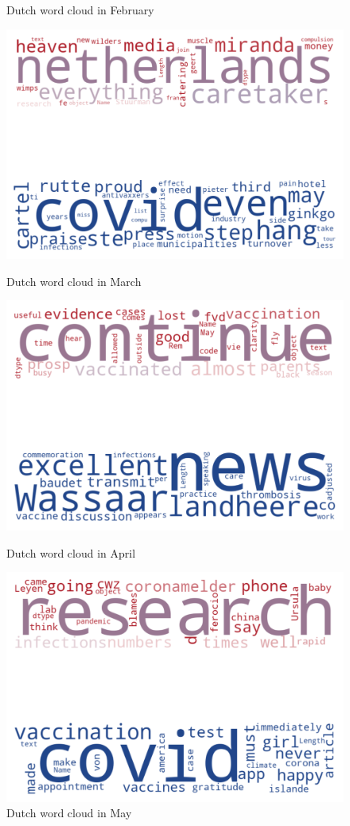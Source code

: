 \begin{landscape}
\begin{figure}[!htb]
  \caption{Dutch word cloud in February}\label{fig:februarynl}
\endminipage
\end{figure}
\begin{figure}[!htb]
  \includegraphics[width=\linewidth]{March nl word cloud.png}
  \caption{Dutch word cloud in March}\label{fig:marchnl}
\endminipage\hfill
{}
  \includegraphics[width=\linewidth]{April nl word cloud.png}
  \caption{Dutch word cloud in April}\label{fig:aprilnl}
\endminipage\hfill
{}
  \includegraphics[width=\linewidth]{May nl word cloud.png}
  \caption{Dutch word cloud in May}\label{fig:maynl}
\endminipage
\end{figure}

\end{landscape}
